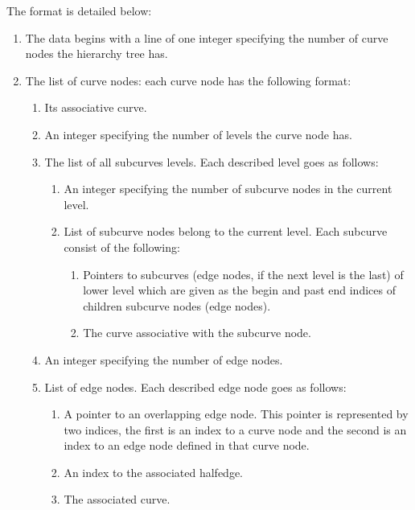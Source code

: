 \begin{itemize}
\begin{ccAdvanced}
The format is detailed below:

\begin{enumerate}
    \item The data begins with a line of one integer specifying the number 
    of curve nodes the hierarchy tree has.
    \item The list of curve nodes: 
    each curve node has the following format:
    \begin{enumerate}
        \item Its associative curve.
        \item An integer specifying the number of levels the curve node has.
        \item The list of all subcurves levels. Each described level goes as 
              follows:
        \begin{enumerate}
            \item An integer specifying the number of subcurve nodes in the 
                  current level.
            \item List of subcurve nodes belong to the current level. 
            Each subcurve consist of the following:
            \begin{enumerate}
                \item Pointers to subcurves (edge nodes, if the next level 
                      is the last) 
                      of lower level which are given as the begin and past 
                      end indices of children subcurve nodes (edge nodes).
                \item The curve associative with the subcurve node.
            \end{enumerate}
        \end{enumerate}
        \item An integer specifying the number of edge nodes.
        \item List of edge nodes. Each described edge node goes as follows:
        \begin{enumerate}
            \item A pointer to an overlapping edge node.
            This pointer is represented by two indices, the first is an index 
            to a curve node 
            and the second is an index to an edge node defined in that curve 
            node.
            \item An index to the associated halfedge.
            \item The associated curve.
        \end{enumerate}    
    \end{enumerate}
\end{enumerate}


\end{ccAdvanced}
\end{itemize}
